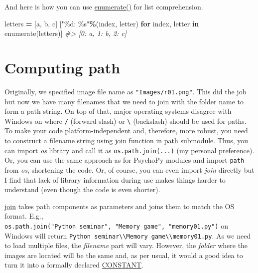 \documentclass[
]{book}
\newenvironment{Shaded}{\begin{snugshade}}{\end{snugshade}}
\newcommand{\BuiltInTok}[1]{#1}
\newcommand{\CommentTok}[1]{\textcolor[rgb]{0.56,0.35,0.01}{\textit{#1}}}
\newcommand{\ControlFlowTok}[1]{\textcolor[rgb]{0.13,0.29,0.53}{\textbf{#1}}}
\newcommand{\KeywordTok}[1]{\textcolor[rgb]{0.13,0.29,0.53}{\textbf{#1}}}
\newcommand{\NormalTok}[1]{#1}
\newcommand{\OperatorTok}[1]{\textcolor[rgb]{0.81,0.36,0.00}{\textbf{#1}}}
\newcommand{\SpecialCharTok}[1]{\textcolor[rgb]{0.00,0.00,0.00}{#1}}
\newcommand{\StringTok}[1]{\textcolor[rgb]{0.31,0.60,0.02}{#1}}
\begin{document}
And here is how you can use \href{https://docs.python.org/3/library/functions.html\#enumerate}{enumerate()} for list comprehension.

\begin{Shaded}
\begin{Highlighting}[]
\NormalTok{letters }\OperatorTok{=}\NormalTok{ [}\StringTok{\textquotesingle{}a\textquotesingle{}}\NormalTok{, }\StringTok{\textquotesingle{}b\textquotesingle{}}\NormalTok{, }\StringTok{\textquotesingle{}c\textquotesingle{}}\NormalTok{]}
\NormalTok{[}\StringTok{"}\SpecialCharTok{\%d}\StringTok{: }\SpecialCharTok{\%s}\StringTok{"}\OperatorTok{\%}\NormalTok{(index, letter) }\ControlFlowTok{for}\NormalTok{ index, letter }\KeywordTok{in} \BuiltInTok{enumerate}\NormalTok{(letters)]}
\CommentTok{\#\textgreater{} [\textquotesingle{}0: a\textquotesingle{}, \textquotesingle{}1: b\textquotesingle{}, \textquotesingle{}2: c\textquotesingle{}]}
\end{Highlighting}
\end{Shaded}

\hypertarget{os-library}{%
\section{Computing path}\label{os-library}}

Originally, we specified image file name as \texttt{"Images/r01.png"}. This did the job but now we have many filenames that we need to join with the folder name to form a path string. On top of that, major operating systems disagree with Windows on where \texttt{/} (forward slash) or \texttt{\textbackslash{}} (backslash) should be used for paths. To make your code platform-independent and, therefore, more robust, you need to construct a filename string using \href{https://docs.python.org/3/library/os.path.html\#os.path.join}{join} function in \href{https://docs.python.org/3/library/os.path.html}{path} submodule. Thus, you can import \emph{os} library and call it as \texttt{os.path.join(...)} (my personal preference). Or, you can use the same approach as for PsychoPy modules and import \texttt{path} from \emph{os}, shortening the code. Or, of course, you can even import \emph{join} directly but I find that lack of library information during use makes things harder to understand (even though the code is even shorter).

\href{https://docs.python.org/3/library/os.path.html\#os.path.join}{join} takes path components as parameters and joins them to match the OS format. E.g., \texttt{os.path.join("Python\ seminar",\ "Memory\ game",\ "memory01.py")} on Windows will return \texttt{\textquotesingle{}Python\ seminar\textbackslash{}\textbackslash{}Memory\ game\textbackslash{}\textbackslash{}memory01.py\textquotesingle{}}. As we need to load multiple files, the \emph{filename} part will vary. However, the \emph{folder} where the images are located will be the same and, as per usual, it would a good idea to turn it into a formally declared \protect\hyperlink{constants}{CONSTANT}.
\end{document}
